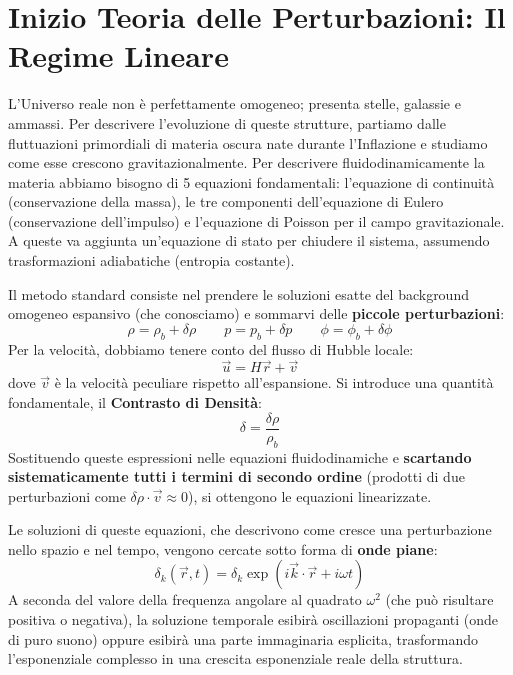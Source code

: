 \documentclass[11pt,a4paper]{report}
\begin{document}
\section{Inizio Teoria delle Perturbazioni: Il Regime Lineare}

L'Universo reale non è perfettamente omogeneo; presenta stelle, galassie e ammassi. Per descrivere l'evoluzione di queste strutture, partiamo dalle fluttuazioni primordiali di materia oscura nate durante l'Inflazione e studiamo come esse crescono gravitazionalmente.
Per descrivere fluidodinamicamente la materia abbiamo bisogno di 5 equazioni fondamentali: l'equazione di continuità (conservazione della massa), le tre componenti dell'equazione di Eulero (conservazione dell'impulso) e l'equazione di Poisson per il campo gravitazionale. A queste va aggiunta un'equazione di stato per chiudere il sistema, assumendo trasformazioni adiabatiche (entropia costante).

Il metodo standard consiste nel prendere le soluzioni esatte del background omogeneo espansivo (che conosciamo) e sommarvi delle \textbf{piccole perturbazioni}:
\begin{equation}
\rho = \rho_b + \delta\rho \qquad p = p_b + \delta p \qquad \phi = \phi_b + \delta\phi
\end{equation}
Per la velocità, dobbiamo tenere conto del flusso di Hubble locale:
\begin{equation}
\vec{u} = H\vec{r} + \vec{v}
\end{equation}
dove $\vec{v}$ è la velocità peculiare rispetto all'espansione.
Si introduce una quantità fondamentale, il \textbf{Contrasto di Densità}:
\begin{equation}
\delta = \frac{\delta\rho}{\rho_b}
\end{equation}
Sostituendo queste espressioni nelle equazioni fluidodinamiche e \textbf{scartando sistematicamente tutti i termini di secondo ordine} (prodotti di due perturbazioni come $\delta\rho \cdot \vec{v} \approx 0$), si ottengono le equazioni linearizzate. 

Le soluzioni di queste equazioni, che descrivono come cresce una perturbazione nello spazio e nel tempo, vengono cercate sotto forma di \textbf{onde piane}:
\begin{equation}
\delta_k(\vec{r}, t) = \delta_k \exp(i\vec{k}\cdot\vec{r} + i\omega t)
\end{equation}
A seconda del valore della frequenza angolare al quadrato $\omega^2$ (che può risultare positiva o negativa), la soluzione temporale esibirà oscillazioni propaganti (onde di puro suono) oppure esibirà una parte immaginaria esplicita, trasformando l'esponenziale complesso in una crescita esponenziale reale della struttura.
\end{document}
